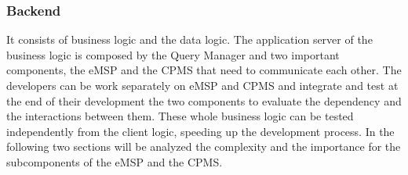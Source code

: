 \subsubsection{Backend}
It consists of business logic and the data logic. The application server of the business logic is composed by the Query Manager and two important components,
the eMSP and the CPMS that need to communicate each other. The developers can be work separately on 
eMSP and CPMS and integrate and test at the end of their development the two components to evaluate the dependency and the interactions between them.
These whole business logic can be tested independently from the client logic, speeding up the development process. 
In the following two sections will be analyzed the complexity and the importance for the subcomponents of the eMSP and the CPMS.
\\
